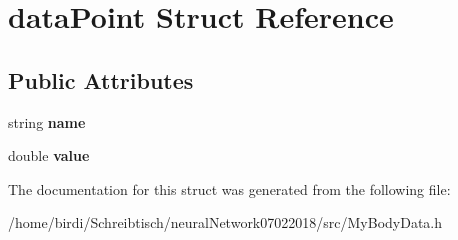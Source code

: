 \hypertarget{structdataPoint}{}\section{data\+Point Struct Reference}
\label{structdataPoint}
\subsection*{Public Attributes}
\begin{DoxyCompactItemize}
\item 
\mbox{\label{structdataPoint_a0a55235797730b5b5c43386e8c7ad5ab}} 
string {\bfseries name}
\item 
\mbox{\label{structdataPoint_a53e6a0cc11af7f963d11e7d9e245a260}} 
double {\bfseries value}
\end{DoxyCompactItemize}


The documentation for this struct was generated from the following file\+:\begin{DoxyCompactItemize}
\item 
/home/birdi/\+Schreibtisch/neural\+Network07022018/src/My\+Body\+Data.\+h\end{DoxyCompactItemize}
